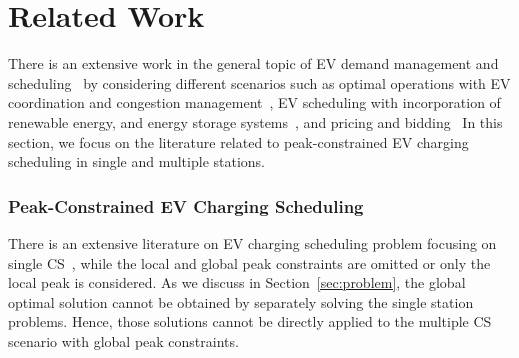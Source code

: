 \documentclass[journal]{IEEEtran}
\newcommand{\revv}[1]{{\color{black}#1}}%
\begin{document}


\section{Related Work}
\label{sec:rel}
\revv{There is an extensive work in the general topic of EV demand management and scheduling~\cite{mukherjee2015review} by considering different scenarios such as optimal operations with EV coordination and congestion management~\cite{mukherjee2017distributed,rigas2013congestion,hu2013coordinated}, EV scheduling with incorporation of renewable energy, and energy storage systems~\cite{de2017impact,shafie2018innovative}, and pricing and bidding~\cite{huang2014distribution,hou2019bidding} In this section, we focus on the literature related to peak-constrained EV charging scheduling in single and multiple stations.}
\subsubsection{Peak-Constrained EV Charging Scheduling}
\label{sec:rel:peakconstrained}			
\revv{There is an extensive literature on EV charging scheduling problem focusing on single CS~\cite{Tang,Wen}, while the local and global peak constraints are omitted or only the local peak is considered.}	As we discuss in Section~\ref{sec:problem}, the global optimal solution cannot be obtained by separately solving the single station problems. Hence, those solutions cannot be directly applied to the multiple CS scenario with global peak constraints. 
\end{document}
